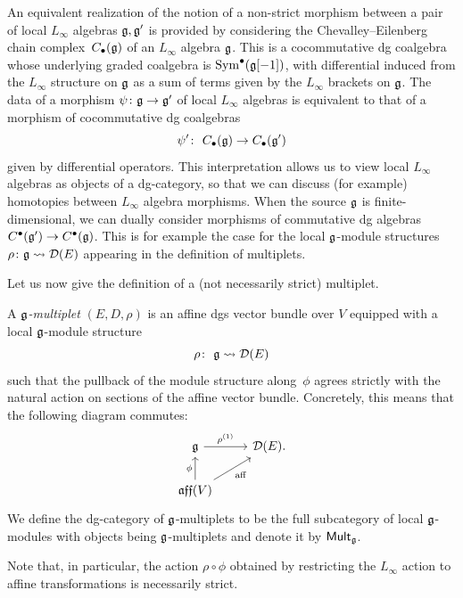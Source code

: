 \documentclass[11pt]{article}
\numberwithin{equation}{section}
\numberwithin{equation}{section}
\def\cat#1{\ensuremath{\mathsf{#1}}}
\DeclareMathOperator{\Mult}{\cat{Mult}}
\def\lie#1{\ensuremath{\mathfrak{#1}}}
\def\aff{\ensuremath{\lie{aff}}}
\DeclareMathOperator{\Sym}{Sym}
\begin{document}
\begin{rmk}
	An equivalent realization of the notion of a non-strict morphism between a pair of local $L_\infty$ algebras $\mathfrak g,\mathfrak g'$ is provided by considering the Chevalley--Eilenberg chain complex~$C_\bullet(\mathfrak g)$ of an $L_\infty$ algebra $\mathfrak g$. This is a cocommutative dg coalgebra whose underlying graded coalgebra is $\Sym^\bullet(\fg[-1])$, with differential induced from the $L_\infty$ structure on $\mathfrak g$ as a sum of terms given by the $L_\infty$ brackets on $\mathfrak g$. The data of a morphism $\psi \colon \mathfrak g \to \mathfrak g'$ of local $L_\infty$ algebras is equivalent to that of a morphism of cocommutative dg coalgebras
	\[\psi' \colon \ C_\bullet(\mathfrak g) \to C_\bullet(\mathfrak g')\]
	given by differential operators. This interpretation allows us to view local $L_\infty$ algebras as objects of a dg-category, so that we can discuss (for example) homotopies between $L_\infty$ algebra morphisms. When the source $\mathfrak g$ is finite-dimensional, we can dually consider morphisms of commutative dg algebras $C^\bullet(\mathfrak g') \to C^\bullet(\mathfrak g)$. This is for example the case for the local $\mathfrak g$-module structures $\rho \colon \mathfrak g \rightsquigarrow \mathcal D(E)$ appearing in the definition of multiplets.
\end{rmk}

Let us now give the definition of a (not necessarily strict) multiplet.
\begin{dfn}
	A \emph{$\mathfrak g$-multiplet} $(E,D,\rho)$ is an affine dgs vector bundle over $V$ equipped with a local $\mathfrak g$-module structure
	\begin{equation*}
	\rho\colon \ \mathfrak g \rightsquigarrow \mathcal D(E)
	\end{equation*}
	such that the pullback of the module structure along~$\phi$ agrees strictly with the natural action on sections of the affine vector bundle. Concretely, this means that the following diagram commutes:
	\begin{equation*}
	\begin{tikzcd}
	\fg \arrow[r, "\rho^{(1)}"] & \cD(E). \\
	\aff(V) \arrow[ru, "\mathrm{aff}" '] \arrow[u,"\phi"]
	\end{tikzcd}
	\end{equation*}
	We define the dg-category of $\mathfrak g$-multiplets to be the full subcategory of local $\mathfrak g$-modules with objects being $\mathfrak g$-multiplets and denote it by $\Mult_{\fg}$.
\end{dfn}

\begin{rmk}
	Note that, in particular, the action $\rho \circ \phi$ obtained by restricting the $L_\infty$ action to affine transformations is necessarily strict.
\end{rmk}
\end{document}
